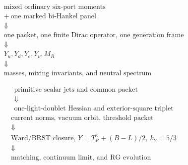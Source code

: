 \documentclass[11pt,oneside,openany]{book}
\numberwithin{equation}{chapter}
\theoremstyle{definition}
\theoremstyle{remark}
\begin{document}
\[
\boxed{\begin{array}{c}
\text{mixed ordinary six-port moments}\\
+\ \text{one marked bi-Hankel panel}\\
\Downarrow\\
\text{one packet, one finite Dirac operator, one generation frame}\\
\Downarrow\\
Y_u,Y_d,Y_e,Y_\nu,M_R\\
\Downarrow\\
\text{masses, mixing invariants, and neutral spectrum}
\end{array}}
\]

\[
\boxed{\begin{array}{c}
\text{primitive scalar jets and common packet}\\
\Downarrow\\
\text{one-light-doublet Hessian and exterior-square triplet}
\end{array}}
\]
\[
\boxed{\begin{array}{c}
\text{current norms, vacuum orbit, threshold packet}\\
\Downarrow\\
\text{Ward/BRST closure, }Y=T_R^3+(B-L)/2,\ k_Y=5/3\\
\Downarrow\\
\text{matching, continuum limit, and RG evolution}
\end{array}}
\]
\end{document}
